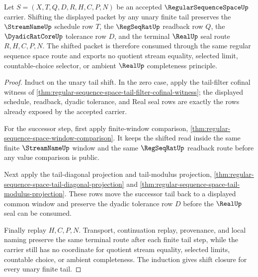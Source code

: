 \begin{theorem}\label{thm:regular-sequence-space-shift-closure}
Let $S=(X,T,Q,D,R,H,C,P,N)$ be an accepted $\RegularSequenceSpaceUp$ carrier. Shifting the displayed packet by any unary finite tail preserves the $\StreamNameUp$ schedule row $T$, the $\RegSeqRatUp$ readback row $Q$, the $\DyadicRatCoreUp$ tolerance row $D$, and the terminal $\RealUp$ seal route $R,H,C,P,N$. The shifted packet is therefore consumed through the same regular sequence space route and exports no quotient stream equality, selected limit, countable-choice selector, or ambient $\RealUp$ completeness principle.
\end{theorem}
\begin{proof}
Induct on the unary tail shift. In the zero case, apply the tail-filter cofinal witness of \autoref{thm:regular-sequence-space-tail-filter-cofinal-witness}; the displayed schedule, readback, dyadic tolerance, and Real seal rows are exactly the rows already exposed by the accepted carrier.

For the successor step, first apply finite-window comparison, \autoref{thm:regular-sequence-space-window-comparison}. It keeps the shifted read inside the same finite $\StreamNameUp$ window and the same $\RegSeqRatUp$ readback route before any value comparison is public.

Next apply the tail-diagonal projection and tail-modulus projection, \autoref{thm:regular-sequence-space-tail-diagonal-projection} and \autoref{thm:regular-sequence-space-tail-modulus-projection}. These rows move the successor tail back to a displayed common window and preserve the dyadic tolerance row $D$ before the $\RealUp$ seal can be consumed.

Finally replay $H,C,P,N$. Transport, continuation replay, provenance, and local naming preserve the same terminal route after each finite tail step, while the carrier still has no coordinate for quotient stream equality, selected limits, countable choice, or ambient completeness. The induction gives shift closure for every unary finite tail.
\end{proof}


